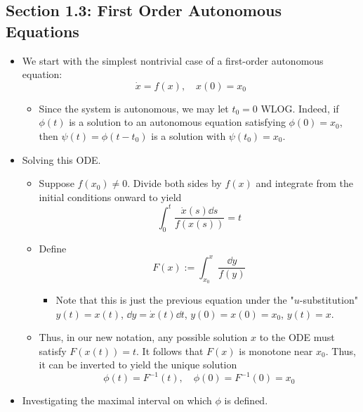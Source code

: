 \documentclass[../notes.tex]{subfiles}
\begin{document}
\subsection*{Section 1.3: First Order Autonomous Equations}
\begin{itemize}
    \item {}We start with the simplest nontrivial case of a first-order autonomous equation:
    \begin{equation*}
        \dot{x} = f(x)
        ,\quad
        x(0) = x_0
    \end{equation*}
    \begin{itemize}
        \item Since the system is autonomous, we may let $t_0=0$ WLOG. Indeed, if $\phi(t)$ is a solution to an autonomous equation satisfying $\phi(0)=x_0$, then $\psi(t)=\phi(t-t_0)$ is a solution with $\psi(t_0)=x_0$.
    \end{itemize}
    \item Solving this ODE.
    \begin{itemize}
        \item Suppose $f(x_0)\neq 0$. Divide both sides by $f(x)$ and integrate from the initial conditions onward to yield
        \begin{equation*}
            \int_0^t\frac{\dot{x}(s)\dd{s}}{f(x(s))} = t
        \end{equation*}
        \item Define
        \begin{equation*}
            F(x) := \int_{x_0}^x\frac{\dd{y}}{f(y)}
        \end{equation*}
        \begin{itemize}
            \item Note that this is just the previous equation under the "$u$-substitution" $y(t)=x(t)$, $\dd{y}=\dot{x}(t)\dd{t}$, $y(0)=x(0)=x_0$, $y(t)=x$.
        \end{itemize}
        \item Thus, in our new notation, any possible solution $x$ to the ODE must satisfy $F(x(t))=t$. It follows that $F(x)$ is monotone near $x_0$. Thus, it can be inverted to yield the unique solution
        \begin{equation*}
            \phi(t) = F^{-1}(t)
            ,\quad
            \phi(0) = F^{-1}(0) = x_0
        \end{equation*}
    \end{itemize}
    \item Investigating the maximal interval on which $\phi$ is defined.

\end{itemize}
\end{document}
